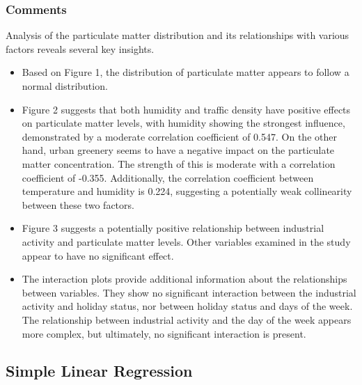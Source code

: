 \documentclass{article}
\begin{document}
\subsubsection*{Comments}
Analysis of the particulate matter distribution and its relationships with various factors reveals several key insights. 
\begin{itemize}
    \item Based on Figure 1, the distribution of particulate matter appears to follow a normal distribution. 
    \item Figure 2 suggests that both humidity and traffic density have positive effects on particulate matter levels, with humidity showing the strongest influence, demonstrated by a moderate correlation coefficient of 0.547. On the other hand, urban greenery seems to have a negative impact on the particulate matter concentration. The strength of this is moderate with a correlation coefficient of -0.355. Additionally, the correlation coefficient between temperature and humidity is 0.224, suggesting a potentially weak collinearity between these two factors. 
    \item Figure 3 suggests a potentially positive relationship between industrial activity and particulate matter levels. Other variables examined in the study appear to have no significant effect.
    \item The interaction plots provide additional information about the relationships between variables. They show no significant interaction between the industrial activity and holiday status, nor between holiday status and days of the week. The relationship between industrial activity and the day of the week appears more complex, but ultimately, no significant interaction is present.
\end{itemize}


\subsection{Simple Linear Regression}
\end{document}
